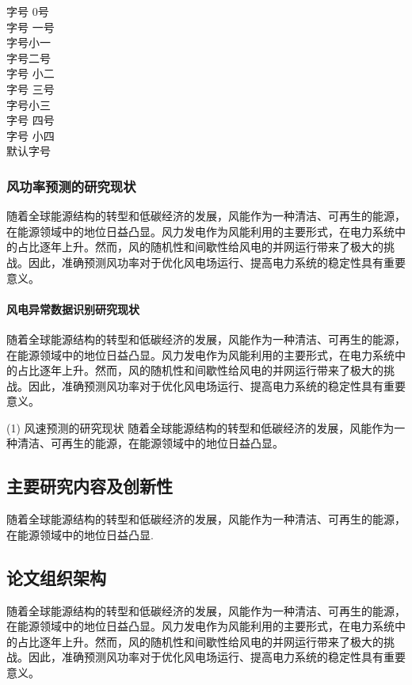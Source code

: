 \documentclass[a4paper, zihao=-4, twoside, fontset=fandol]{ctexart}
\begin{document}
{{ %
\begin{flushleft} %
    \noindent
    \heiti 
    { 字号 0号}\\
    { 字号 一号}\\
    { 字号小一}\\
    { 字号二号 }\\
    { 字号 小二}\\
    { 字号 三号}\\
    { 字号小三}\\
    { 字号 四号}\\
    { 字号 小四}\\
    {默认字号}\\
\end{flushleft}
}

\subsubsection{风功率预测的研究现状}
随着全球能源结构的转型和低碳经济的发展，风能作为一种清洁、可再生的能源，在能源领域中的地位日益凸显。风力发电作为风能利用的主要形式，在电力系统中的占比逐年上升。然而，风\cite{what_is_system-2}的随机性和间歇性给风电的并网运行带来了极大的挑战。因此，准确预测风功率对于优化风电场运行、提高电力系统的稳定性具有重要意义。

\paragraph{风电异常数据识别研究现状}
随着全球能源结构的转型和低碳经济的发展，风能作为一种清洁、可再生的能源，在能源领域\cite{吴大任1979微分几何讲义}中的地位日益凸显。风力发电作为风能利用的主要形式，在电力系统中的占比逐年上升。然而，风的随机性和间歇性给风电的并网运行带来了极大的挑战。因此，准确预测风功率对于优化风电场运行、提高电力系统的稳定性具有重要意义。

(1) 风速预测的研究现状
随着全球能源结构的转型和低碳经济的发展，风能作为一种清洁、可再生的能源，在能源领域中的地位日益凸显。

\subsection{主要研究内容及创新性}
随着全球能源结构的转型和低碳经济的发展，风能作为一种清洁、可再生的能源，在能源领域中的地位日益凸显.

\subsection{论文组织架构}
随着全球能源结构的转型和低碳经济的发展，风能作为一种清洁、可再生的能源，在能源领域中的地位日益凸显。风力发电作为风能利用的主要形式，在电力系统中的占比逐年上升。然而，风的随机性和间歇性给风电的并网运行带来了极大的挑战。因此，准确预测风功率对于优化风电场运行、提高电力系统的稳定性具有重要意义。


}
\end{document}
